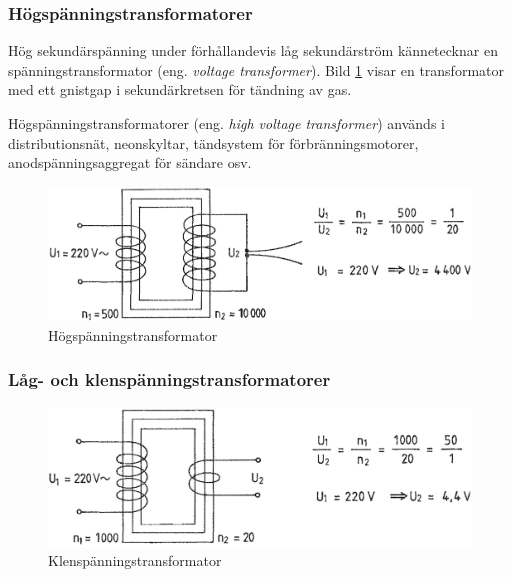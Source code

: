 \subsubsection{Högspänningstransformatorer}

Hög sekundärspänning under förhållandevis låg sekundärström kännetecknar en
spänningstransformator (eng. \emph{voltage transformer}).
Bild \ref{fig:BildII2-10} visar en transformator med ett gnistgap i
sekundärkretsen för tändning av gas.

Högspänningstransformatorer (eng. \emph{high voltage transformer})
används i distributionsnät, neonskyltar, tändsystem för förbränningsmotorer,
anodspänningsaggregat för sändare osv.

\begin{figure}[ht]
\begin{center}
\includegraphics[width=\textwidth]{images/cropped_pdfs/bild_2_2-10.pdf}
\caption{Högspänningstransformator}
\label{fig:BildII2-10}
\end{center}
\end{figure}

\subsubsection{Låg- och klenspänningstransformatorer}

\begin{figure}[ht]
\begin{center}
\includegraphics[width=\textwidth]{images/cropped_pdfs/bild_2_2-11.pdf}
\caption{Klenspänningstransformator}
\label{fig:BildII2-11}
\end{center}
\end{figure}

